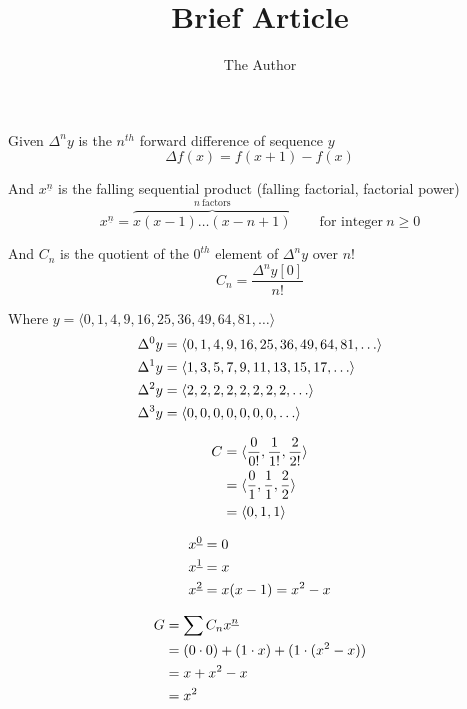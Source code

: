 \documentclass[12pt]{article} %
\title{Brief Article}
\author{The Author}
\begin{document}
Given $\Delta^n y$ is the $n^{th}$ forward difference of sequence $y$
\begin{equation}
\Delta f(x)=f(x+1)-f(x)
\end{equation}

And $x^{\underline n}$ is the falling sequential product (falling factorial, factorial power)
\begin{equation}
x^{\underline n}=\overbrace{x(x-1)\ldots(x-n+1)}^{n~\mathrm{factors}}\qquad\mbox{for integer}~n\ge0
\end{equation}

And $C_n$ is the quotient of the $0^{th}$ element of $\Delta^n y$ over $n!$
\begin{equation}
C_n = \frac{\Delta^n y[0]}{n!}
\end{equation}

Where $y = \langle 0,1,4,9,16,25,36,49,64,81,\ldots\rangle$\\
\begin{align}
\notag \Delta^0 y &= \langle 0,1,4,9,16,25,36,49,64,81,\ldots\rangle\\
\Delta^1 y &= \langle 1,3,5,7,9,11,13,15,17,\ldots\rangle\\
\notag \Delta^2 y &= \langle 2,2,2,2,2,2,2,2,\ldots\rangle\\
\notag \Delta^3 y &= \langle 0,0,0,0,0,0,0,\ldots\rangle
\end{align}

\begin{align}
\notag C &= \langle\frac{0}{0!},\frac{1}{1!},\frac{2}{2!}\rangle\\
&= \langle\frac{0}{1},\frac{1}{1},\frac{2}{2}\rangle\\
\notag &= \langle0,1,1\rangle
\end{align}

\begin{align}
\notag x^{\underline 0} &= 0\\
x^{\underline 1} &= x\\
\notag x^{\underline 2} &= x(x-1) = x^2 - x
\end{align}

\begin{align}
G &= {\displaystyle\sum C_n x^{\underline{n}}}\\
\notag &= (0 \cdot 0) + (1 \cdot x) + (1 \cdot (x^2 - x))\\
\notag &= x + x^2 - x\\
\notag &= x^2
\end{align}
\end{document}
